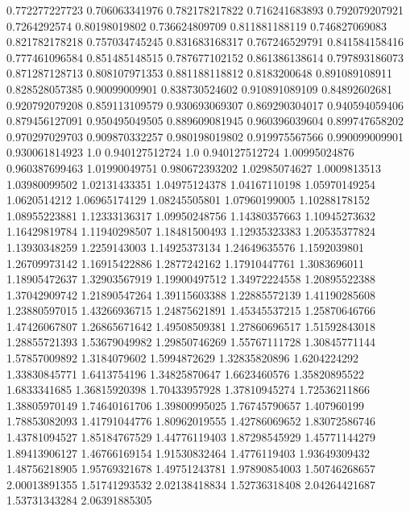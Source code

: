  0.772277227723   0.706063341976
 0.782178217822   0.716241683893
 0.792079207921     0.7264292574
  0.80198019802   0.736624809709
 0.811881188119   0.746827069083
 0.821782178218   0.757034745245
 0.831683168317   0.767246529791
 0.841584158416   0.777461096584
 0.851485148515   0.787677102152
 0.861386138614   0.797893186073
 0.871287128713   0.808107971353
 0.881188118812     0.8183200648
 0.891089108911   0.828528057385
  0.90099009901   0.838730524602
 0.910891089109    0.84892602681
 0.920792079208   0.859113109579
 0.930693069307   0.869290304017
 0.940594059406   0.879456127091
 0.950495049505   0.889609081945
 0.960396039604   0.899747658202
 0.970297029703   0.909870332257
 0.980198019802   0.919975567566
 0.990099009901   0.930061814923
            1.0   0.940127512724
            1.0   0.940127512724
  1.00995024876   0.960387699463
  1.01990049751   0.980672393202
  1.02985074627     1.0009813513
  1.03980099502    1.02131433351
  1.04975124378    1.04167110198
  1.05970149254     1.0620514212
  1.06965174129    1.08245505801
  1.07960199005    1.10288178152
  1.08955223881    1.12333136317
  1.09950248756    1.14380357663
  1.10945273632    1.16429819784
  1.11940298507    1.18481500493
  1.12935323383    1.20535377824
  1.13930348259     1.2259143003
  1.14925373134    1.24649635576
   1.1592039801    1.26709973142
  1.16915422886     1.2877242162
  1.17910447761     1.3083696011
  1.18905472637    1.32903567919
  1.19900497512    1.34972224558
  1.20895522388    1.37042909742
  1.21890547264    1.39115603388
  1.22885572139    1.41190285608
  1.23880597015    1.43266936715
  1.24875621891    1.45345537215
  1.25870646766    1.47426067807
  1.26865671642    1.49508509381
  1.27860696517    1.51592843018
  1.28855721393    1.53679049982
  1.29850746269    1.55767111728
  1.30845771144    1.57857009892
   1.3184079602     1.5994872629
  1.32835820896     1.6204224292
  1.33830845771     1.6413754196
  1.34825870647     1.6623460576
  1.35820895522     1.6833341685
  1.36815920398    1.70433957928
  1.37810945274    1.72536211866
  1.38805970149    1.74640161706
  1.39800995025    1.76745790657
    1.407960199    1.78853082093
  1.41791044776    1.80962019555
  1.42786069652    1.83072586746
  1.43781094527    1.85184767529
  1.44776119403    1.87298545929
  1.45771144279    1.89413906127
  1.46766169154    1.91530832464
   1.4776119403    1.93649309432
  1.48756218905    1.95769321678
  1.49751243781    1.97890854003
  1.50746268657    2.00013891355
  1.51741293532    2.02138418834
  1.52736318408    2.04264421687
  1.53731343284    2.06391885305
